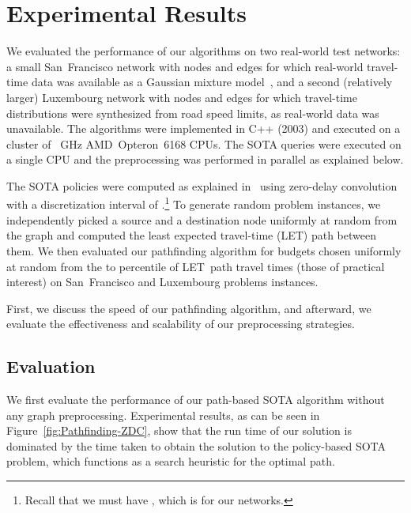\documentclass[oribibl]{llncs}
\begin{document}
	\section{Experimental Results}

			We evaluated the performance of our algorithms on two real-world test networks: a small San~Francisco
			network with  nodes and  edges for which real-world travel-time data was
			available as a Gaussian mixture model~\citep{hunter2013path}, and a second (relatively larger)
			Luxembourg network with  nodes and  edges for which travel-time distributions
			were synthesized from road speed limits, as real-world data was unavailable.
			The algorithms were implemented in C++ (2003) and executed on a cluster of
			~GHz AMD~Opteron\texttrademark~6168 CPUs. The SOTA queries were executed on a single CPU
			and the preprocessing was performed in parallel as explained below.

			The SOTA policies were computed as explained in~\cite{samaranayake2012tractable,samaranayake2012speedup}
			using zero-delay convolution with a discretization interval of
			.\footnote
			{
				Recall that we must have , which is
				 for our networks.
			}
			To generate random problem instances, we independently picked a source and a destination node
			uniformly at random from the graph
			and computed the least expected travel-time (LET) path between them.
			We then evaluated our pathfinding algorithm
			for budgets chosen uniformly at random from the  to 
			percentile of LET~path travel times (those of practical interest) on
			 San~Francisco and  Luxembourg problems instances.

			First, we discuss the speed of our pathfinding algorithm, and afterward,
			we evaluate the effectiveness and scalability of our preprocessing strategies.

		\subsection{Evaluation}

			We first evaluate the performance of our path-based SOTA algorithm without any graph preprocessing.
			Experimental results, as can be seen in Figure~\ref{fig:Pathfinding-ZDC}, show that the run time of
			our solution is dominated by the time taken to obtain the solution to the policy-based SOTA problem,
			which functions as a search heuristic for the optimal path.
\end{document}

